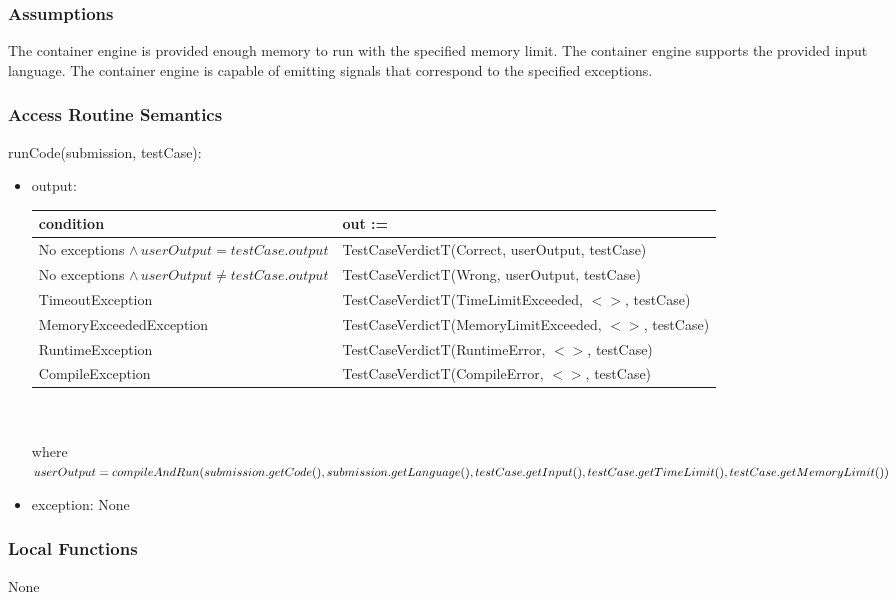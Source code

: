 \documentclass[12pt, titlepage]{article}
\begin{document}
\subsubsection{Assumptions}

The container engine is provided enough memory to run with the specified memory limit. The container engine supports the provided input language. The container engine is capable of emitting signals that correspond to the specified exceptions.

\subsubsection{Access Routine Semantics}

\noindent runCode(submission, testCase):
\begin{itemize}
\item output:\begin{tabular}{p{6cm} p{5cm}}
    \hline
    \textbf{condition} & \textbf{out :=} \\
    \hline
    No exceptions $\land \, userOutput = testCase.output$ & TestCaseVerdictT(Correct, userOutput, testCase) \\
    No exceptions $\land \, userOutput \neq testCase.output$ & TestCaseVerdictT(Wrong, userOutput, testCase) \\
    TimeoutException & TestCaseVerdictT(TimeLimitExceeded, $<>$, testCase) \\
    MemoryExceededException & TestCaseVerdictT(MemoryLimitExceeded, $<>$, testCase) \\
    RuntimeException & TestCaseVerdictT(RuntimeError, $<>$, testCase) \\
    CompileException & TestCaseVerdictT(CompileError, $<>$, testCase) \\

    \hline
    \end{tabular}  
\\\\ where  $userOutput = compileAndRun(submission.getCode(), submission.getLanguage(),\\ testCase.getInput(), testCase.getTimeLimit(), testCase.getMemoryLimit())$
\item exception: None
\end{itemize}

\subsubsection{Local Functions}
None
\end{document}
